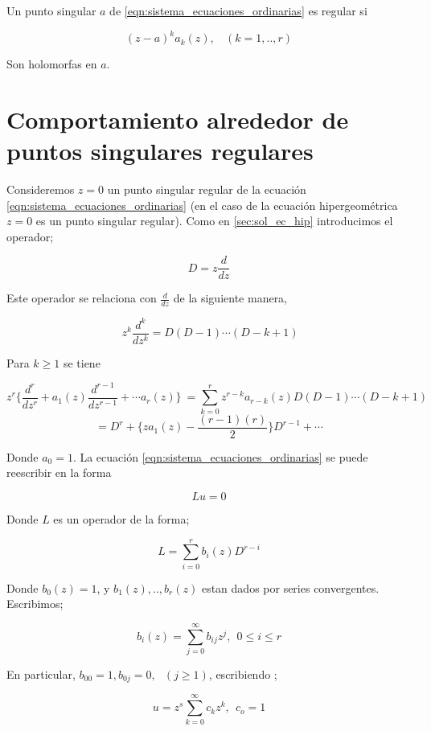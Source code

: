 \begin{defn} Un punto singular $a$ de \ref{eqn:sistema_ecuaciones_ordinarias} es regular si

$$(z-a)^{k}a_{k}(z), \ \ \ \ (k=1,..,r)$$

Son holomorfas en $a$.
\end{defn}

\section{Comportamiento alrededor de puntos singulares regulares}

Consideremos $z=0$ un punto singular regular de la ecuaci\'on  \ref{eqn:sistema_ecuaciones_ordinarias} (en el caso de la ecuaci\'on hipergeom\'etrica $z=0$ es un punto singular regular). Como en \ref{sec:sol_ec_hip} introducimos el operador;

$$D= z\frac{d}{dz} $$

Este operador se relaciona con $\frac{d}{dz}$ de la siguiente manera,

\begin{equation}  \label{relacion-operadores-com-alr-pun-sing}  \ z^{k}\frac{d^{k}}{dz^{k}}= D(D-1) \cdots (D-k+1) \end{equation}

Para $k \geq 1 $ se tiene

$$ z^{r} \lbrace \frac{d^{r}}{dz^{r}} + a_{1}(z) \frac{d^{r-1}}{dz^{r-1}} + \cdots a_{r}(z) \rbrace \
= \sum_{k=0}^{r} z^{r-k}a_{r-k}(z)D(D-1) \cdots (D-k+1) \ $$
$$=D^{r} + \lbrace za_{1}(z) - \frac{(r-1)(r)}{2} \rbrace D^{r-1} + \cdots $$

Donde $a_{0}=1$.
La ecuaci\'on \ref{eqn:sistema_ecuaciones_ordinarias} se puede reescribir en la forma

$$ Lu=0 $$

Donde $L$ es un operador de la forma;

$$ L= \sum_{i=0}^{r} b_{i}(z) D^{r-i}$$

Donde $b_{0}(z) = 1$, y $b_{1}(z),..,b_{r}(z) $ estan dados por series convergentes. Escribimos;

\begin{equation}
  b_{i}(z)=\sum_{j=0}^{\infty} b_{ij}z^{j}, \ \  0 \leq i \leq r
\end{equation}

En particular, $b_{00}= 1, b_{0j}=0, \ \ \ (j \geq 1)$, escribiendo ;

$$ u= z^{s} \sum_{k=0}^{\infty} c_{k} z^{k}, \ \ c_{o}=1$$

